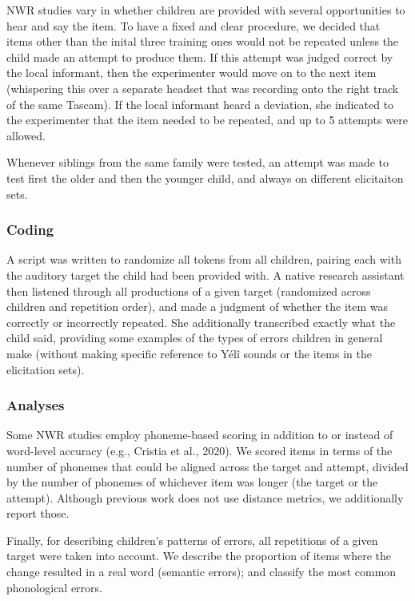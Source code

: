 \documentclass[english,,man,floatsintext]{apa6}
\begin{document}
NWR studies vary in whether children are provided with several opportunities to hear and say the item. To have a fixed and clear procedure, we decided that items other than the inital three training ones would not be repeated unless the child made an attempt to produce them. If this attempt was judged correct by the local informant, then the experimenter would move on to the next item (whispering this over a separate headset that was recording onto the right track of the same Tascam). If the local informant heard a deviation, she indicated to the experimenter that the item needed to be repeated, and up to 5 attempts were allowed.

Whenever siblings from the same family were tested, an attempt was made to test first the older and then the younger child, and always on different elicitaiton sets.

\hypertarget{coding}{%
\subsubsection{Coding}\label{coding}}

A script was written to randomize all tokens from all children, pairing each with the auditory target the child had been provided with. A native research assistant then listened through all productions of a given target (randomized across children and repetition order), and made a judgment of whether the item was correctly or incorrectly repeated. She additionally transcribed exactly what the child said, providing some examples of the types of errors children in general make (without making specific reference to Yélî sounds or the items in the elicitation sets).

\hypertarget{analyses}{%
\subsubsection{Analyses}\label{analyses}}

Some NWR studies employ phoneme-based scoring in addition to or instead of word-level accuracy (e.g., Cristia et al., 2020). We scored items in terms of the number of phonemes that could be aligned across the target and attempt, divided by the number of phonemes of whichever item was longer (the target or the attempt). Although previous work does not use distance metrics, we additionally report those.

Finally, for describing children's patterns of errors, all repetitions of a given target were taken into account. We describe the proportion of items where the change resulted in a real word (semantic errors); and classify the most common phonological errors.
\end{document}
